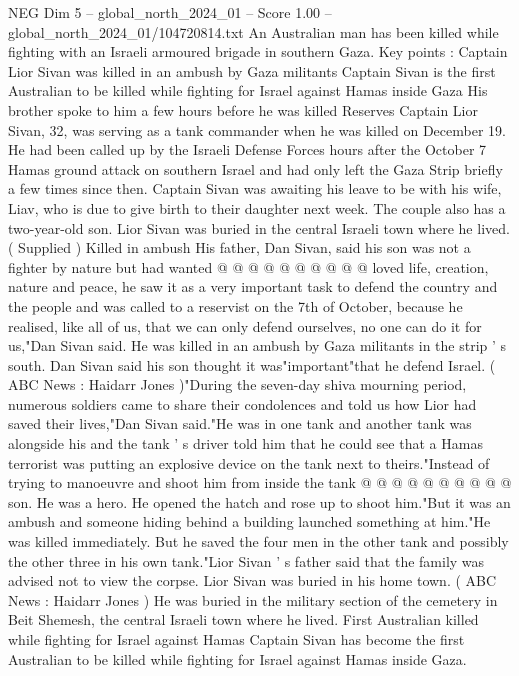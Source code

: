 \begin{textsample}{NEG Dim 5 – global\_north\_2024\_01 – Score 1.00 – global\_north\_2024\_01/104720814.txt}  \label{ex:f5_neg_316}
An Australian man has been killed while fighting with an Israeli armoured brigade in southern Gaza.
Key points : Captain Lior Sivan was killed in an ambush by Gaza militants Captain Sivan is the first Australian to be killed while fighting for Israel against Hamas inside Gaza His brother spoke to him a few hours before he was killed Reserves Captain Lior Sivan, 32, was serving as a tank commander when he was killed on December 19.
He had been called up by the Israeli Defense Forces hours after the October 7 Hamas ground attack on southern Israel and had only left the Gaza Strip briefly a few times since then.
Captain Sivan was awaiting his leave to be with his wife, Liav, who is due to give birth to their daughter next week.
The couple also has a two-year-old son.
Lior Sivan was buried in the central Israeli town where he lived. ( Supplied ) Killed in ambush His father, Dan Sivan, said his son was not a fighter by nature but had wanted @ @ @ @ @ @ @ @ @ @ loved life, creation, nature and peace, he saw it as a very important task to defend the country and the people and was called to a reservist on the 7th of October, because he realised, like all of us, that we can only defend ourselves, no one can do it for us,"Dan Sivan said.
He was killed in an ambush by Gaza militants in the strip ' s south.
Dan Sivan said his son thought it was"important"that he defend Israel. ( ABC News : Haidarr Jones )"During the seven-day shiva mourning period, numerous soldiers came to share their condolences and told us how Lior had saved their lives,"Dan Sivan said."He was in one tank and another tank was alongside his and the tank ' s driver told him that he could see that a Hamas terrorist was putting an explosive device on the tank next to theirs."Instead of trying to manoeuvre and shoot him from inside the tank @ @ @ @ @ @ @ @ @ @ son.
He was a hero.
He opened the hatch and rose up to shoot him."But it was an ambush and someone hiding behind a building launched something at him."He was killed immediately.
But he saved the four men in the other tank and possibly the other three in his own tank."Lior Sivan ' s father said that the family was advised not to view the corpse.
Lior Sivan was buried in his home town. ( ABC News : Haidarr Jones ) He was buried in the military section of the cemetery in Beit Shemesh, the central Israeli town where he lived.
First Australian killed while fighting for Israel against Hamas Captain Sivan has become the first Australian to be killed while fighting for Israel against Hamas inside Gaza.

\end{textsample}

